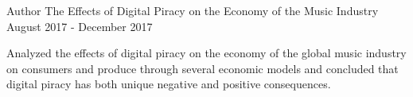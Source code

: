 

\begin{cventries}

  \cventry
    {Author} %
    {The Effects of Digital Piracy on the Economy of the Music Industry} %
    {} %
    {August 2017 - December 2017} %
    {
      \begin{cvitems} %
        \item {Analyzed the effects of digital piracy on the economy of the global music industry on consumers and produce through several economic models and concluded that digital piracy has both unique negative and positive consequences.}
      \end{cvitems}
    }

\end{cventries}
